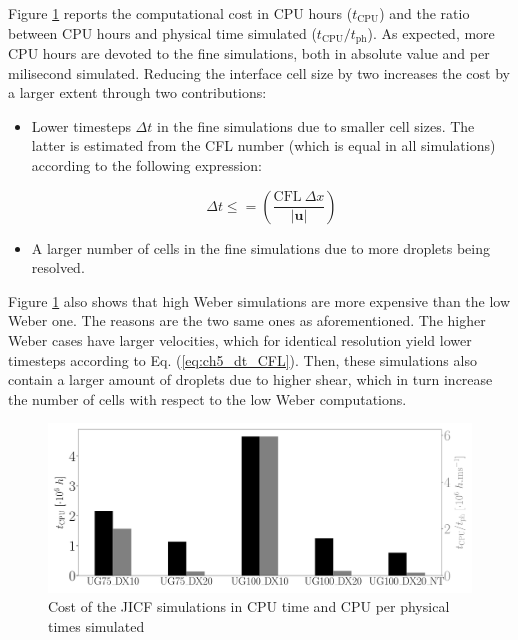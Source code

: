 Figure \ref{fig:SLI_cost_convergence_all} reports the computational cost in CPU hours ($t_\mathrm{CPU}$) and the ratio between CPU hours and physical time simulated ($t_\mathrm{CPU}/t_\mathrm{ph}$). As expected, more CPU hours are devoted to the fine simulations, both in absolute value and per milisecond simulated. Reducing the interface cell size by two increases the cost by a larger extent through two contributions: 

\begin{itemize}

	\item Lower timesteps $\Delta t$ in the fine simulations due to smaller cell sizes. The latter is estimated from the CFL number (which is equal in all simulations) according to the following expression:

\begin{equation}
\label{eq:ch5_dt_CFL}
\Delta t \leq = \left( \frac{\mathrm{CFL} ~   \Delta x }{|\textbf{u}|} \right)
\end{equation}

	\item A larger number of cells in the fine simulations due to more droplets being resolved.

\end{itemize}

Figure \ref{fig:SLI_cost_convergence_all} also shows that high Weber simulations are more expensive than the low Weber one. The reasons are the two same ones as aforementioned. The higher Weber cases have larger velocities, which for identical resolution yield lower timesteps according to Eq. (\ref{eq:ch5_dt_CFL}). Then, these simulations also contain a larger amount of droplets due to higher shear, which in turn increase the number of cells with respect to the low Weber computations.


\begin{figure}[ht]
	\centering
   \includegraphics[scale=0.225]{./part2_developments/figures_ch5_resolved_JICF/SLI_cost_for_convergence/cost_all_simulations}
   \caption{Cost of the JICF simulations in CPU time and CPU per physical times simulated}
   \label{fig:SLI_cost_convergence_all}
\end{figure}





